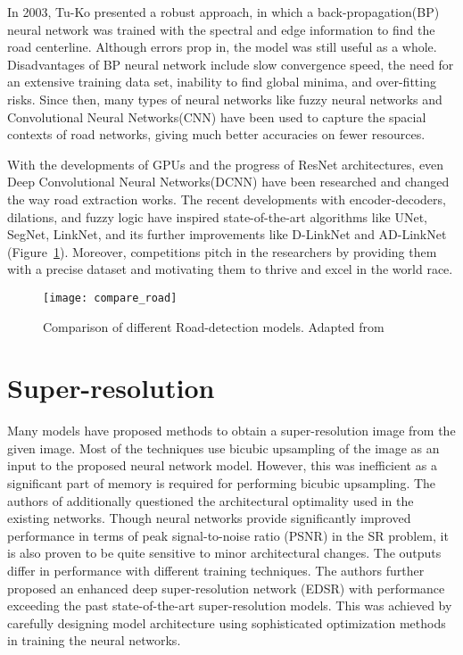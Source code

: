 In 2003, Tu-Ko presented a robust approach, in which a back-propagation(BP) neural network was trained with the spectral and edge information to find the road centerline. Although errors prop in, the model was still useful as a whole. Disadvantages of BP neural network include slow convergence speed, the need for an extensive training data set, inability to find global minima, and over-fitting risks. Since then, many types of neural networks like fuzzy neural networks \cite{mokhtarzade2008automatic} and Convolutional Neural Networks(CNN) have been used to capture the spacial contexts of road networks, giving much better accuracies on fewer resources.

With the developments of GPUs and the progress of ResNet architectures, even Deep Convolutional Neural Networks(DCNN) have been researched and changed the way road extraction works. The recent developments with encoder-decoders, dilations, and fuzzy logic have inspired state-of-the-art algorithms like UNet, SegNet, LinkNet, and its further improvements like D-LinkNet and AD-LinkNet (Figure~\ref{fig:compare_road}). Moreover, competitions pitch in the researchers by providing them with a precise dataset and motivating them to thrive and excel in the world race.

\begin{figure}[h!]
  \centering
  \texttt{[image: compare\_road]}
  \caption[Comparison of different Road-detection models.]{Comparison of different Road-detection models. Adapted from \cite{AD-LinkNet}}
  \label{fig:compare_road}
\end{figure}


\section{Super-resolution}
Many models have proposed methods to obtain a super-resolution image from the given image. Most of the techniques use bicubic upsampling of the image as an input to the proposed neural network model. However, this was inefficient as a significant part of memory is required for performing bicubic upsampling. The authors of %
additionally questioned the architectural optimality used in the existing networks. Though neural networks provide significantly improved performance in terms of peak signal-to-noise ratio (PSNR) in the SR problem, it is also proven to be quite sensitive to minor architectural changes. The outputs differ in performance with different training techniques. The authors further proposed an enhanced deep super-resolution network (EDSR) with performance exceeding the past state-of-the-art super-resolution models. This was achieved by carefully designing model architecture using sophisticated optimization methods in training the neural networks.

